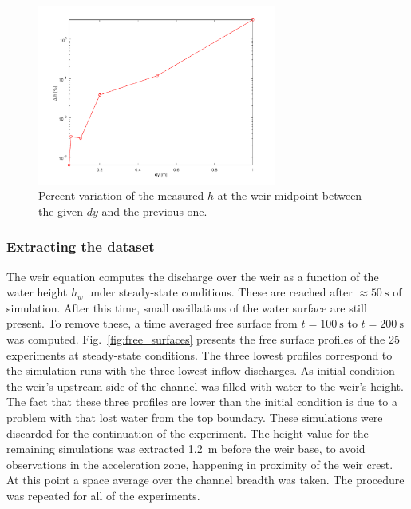 \begin{figure}[h]
  \centering
  \includegraphics[width=0.7\textwidth]{Figures/diff_center.png}
  \caption{Percent variation of the measured $h$ at the weir midpoint between the given $dy$ and the previous one.}
  \label{fig:diff_center}
\end{figure}


\subsubsection{Extracting the dataset}
The weir equation computes the discharge over the weir as a function of the water height $h_w$ under steady-state conditions.
These are reached after $\approx \SI{50}{\s}$ of simulation.
After this time, small oscillations of the water surface are still present.
To remove these, a time averaged free surface from $t = \SI{100}{\s}$ to $t = \SI{200}{\s}$ was computed.
Fig.~\ref{fig:free_surfaces} presents the free surface profiles of the \num{25} experiments at steady-state conditions.
The three lowest profiles correspond to the simulation runs with the three lowest inflow discharges. 
As initial condition the weir's upstream side of the channel was filled with water to the weir's height.
The fact that these three profiles are lower than the initial condition is due to a problem with  that lost water from the top boundary.
These simulations were discarded for the continuation of the experiment.
The height value for the remaining simulations was extracted \SI{1.2}{\m} before the weir base, to avoid observations in the acceleration zone, happening in proximity of the weir crest.
At this point a space average over the channel breadth was taken.
The procedure was repeated for all of the experiments.

